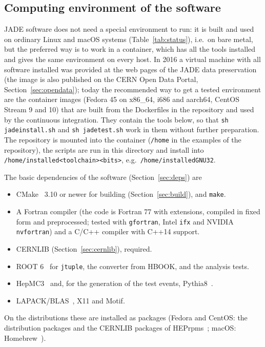 \subsection{Computing environment of the software}
\label{sec:environment}
JADE software does not need a special environment to run: it is built and used on ordinary Linux and macOS
systems (Table~\ref{tab:status}), i.e.\ on bare metal, but the preferred way is to work in a container, which has all the tools installed and gives the same environment on every host. In 2016 a virtual machine with all software installed was provided at
the web pages of the JADE data preservation~\cite{JADE:web} (the image is also published on the CERN Open Data Portal, Section~\ref{sec:opendata}); today the recommended way to get a tested environment are the container images
(Fedora 45 on x86\_64, i686 and aarch64, CentOS Stream 9 and 10) that are built from the Dockerfiles in the
repository and used by the continuous integration. They contain the tools below, so that
\texttt{sh jadeinstall.sh} and \texttt{sh jadetest.sh} work in them without further preparation. The repository is mounted into the container
(\texttt{/home} in the examples of the repository), the scripts are run in this directory and install into \texttt{/home/installed<toolchain><bits>}, e.g.\ \texttt{/home/installedGNU32}.

The basic dependencies of the software (Section~\ref{sec:deps}) are
\begin{itemize}
\item CMake~\cite{CMake:web} 3.10 or newer for building (Section~\ref{sec:build}), and \texttt{make}.
\item A Fortran compiler (the code is Fortran 77 with extensions, compiled in fixed form and preprocessed;
tested with \texttt{gfortran}, Intel \texttt{ifx} and NVIDIA \texttt{nvfortran}) and a C/C++ compiler with C++14
support.
\item CERNLIB (Section~\ref{sec:cernlib}), required.
\item ROOT 6~\cite{Brun:1997pa,Antcheva:2009zz} for \texttt{jtuple}, the converter from HBOOK, and the
analysis tests.
\item HepMC3~\cite{Buckley:2019xhk} and, for the generation of the test events, Pythia8~\cite{Bierlich:2022pfr}.
\item LAPACK/BLAS~\cite{lapack}, X11 and Motif.
\end{itemize}
On the distributions these are installed as packages (Fedora and CentOS: the distribution packages and the
CERNLIB packages of HEPrpms~\cite{Hahn:2022hrpms}; macOS: Homebrew~\cite{Homebrew:web}).

